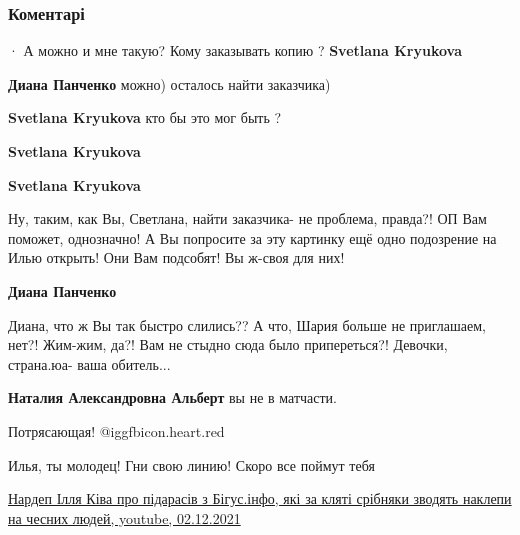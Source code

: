  
 
 
 
 
\subsubsection{Коментарі}
\label{sec:02_12_2021.fb.kiva_ilja.1.spasibo_strana.cmt}

\begin{itemize} %
  · 
А можно и мне такую?
Кому заказывать копию ?
\textbf{Svetlana Kryukova}

\begin{itemize} %
\textbf{Диана Панченко} можно) осталось найти заказчика)

\textbf{Svetlana Kryukova} кто бы это мог быть ?

\textbf{Svetlana Kryukova}

\textbf{Svetlana Kryukova}

Ну, таким, как Вы, Светлана, найти заказчика- не проблема, правда?! ОП Вам
поможет, однозначно! А Вы попросите за эту картинку ещё одно подозрение на Илью
открыть! Они Вам подсобят! Вы ж-своя для них!

\textbf{Диана Панченко}

Диана, что ж Вы так быстро слились?? А что, Шария больше не приглашаем, нет?!
Жим-жим, да?! Вам не стыдно сюда было припереться?! Девочки, страна.юа- ваша
обитель...

\textbf{Наталия Александровна Альберт} вы не в матчасти.

\end{itemize} %

Потрясающая! @igg{fbicon.heart.red}

Илья, ты молодец! Гни свою линию! Скоро все поймут тебя

\href{https://youtu.be/ZA6ohXs7u4M}{%
Нардеп Ілля Ківа про підарасів з Бігус.інфо, які за кляті срібняки зводять наклепи на чесних людей, %
youtube, 02.12.2021%
}


\end{itemize}
